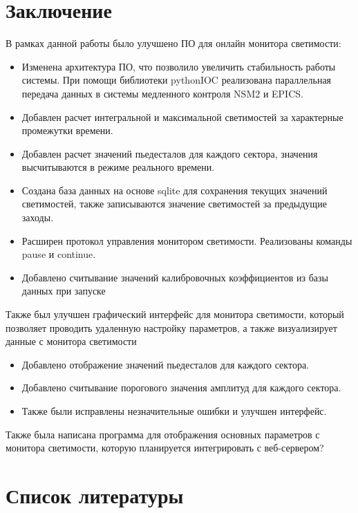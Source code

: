 \documentclass[a4paper, 12pt]{article}
\begin{document}
\section{Заключение}
    В рамках данной работы было улучшено ПО для онлайн монитора светимости:
    \begin{itemize}
        \item Изменена архитектура ПО, что позволило увеличить стабильность работы системы. При помощи библиотеки pythonIOC реализована параллельная передача данных в системы медленного контроля NSM2 и EPICS.
        \item Добавлен расчет интегральной и максимальной светимостей за характерные промежутки времени.
        \item Добавлен расчет значений пьедесталов для каждого сектора, значения высчитываются в режиме реального времени.
        \item Создана база данных на основе sqlite для сохранения текущих значений светимостей, также записываются значение светимостей за предыдущие заходы.
        \item Расширен протокол управления монитором светимости. Реализованы команды pause и continue.
        \item Добавлено считывание значений калибровочных коэффициентов из базы данных при запуске
    \end{itemize}
    
    Также был улучшен графический интерфейс для монитора светимости, который позволяет проводить удаленную настройку параметров, а также визуализирует данные с монитора светимости
    \begin{itemize} 
        \item Добавлено отображение значений пьедесталов для каждого сектора.
        \item Добавлено считывание порогового значения амплитуд для каждого сектора.
        \item Также были исправлены незначительные ошибки и улучшен интерфейс.
    \end{itemize}
    
    Также была написана программа для отображения основных параметров с монитора светимости, которую планируется интегрировать с веб-сервером?

\section{Список литературы}
\end{document}
